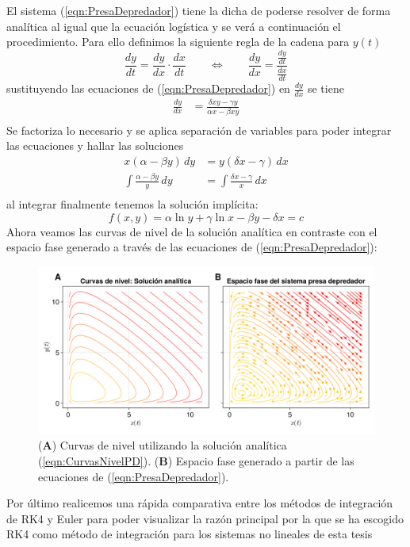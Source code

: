 El sistema (\ref{eqn:PresaDepredador}) tiene la dicha de poderse resolver de forma analítica al igual que la ecuación logística y se verá a continuación el procedimiento. Para ello definimos la siguiente regla de la cadena para $y(t)$
$$\frac{dy}{dt} = \frac{dy}{dx}\cdot\frac{dx}{dt}\qquad\Longleftrightarrow\qquad\frac{dy}{dx}=\frac{\frac{dy}{dt}}{\frac{dx}{dt}}$$
sustituyendo las ecuaciones de (\ref{eqn:PresaDepredador}) en $\frac{dy}{dx}$ se tiene
\begin{align*}
	\frac{dy}{dx}&=\frac{\delta xy-\gamma y}{\alpha x-\beta xy}  \\
\end{align*}
Se factoriza lo necesario y se aplica separación de variables para poder integrar las ecuaciones y hallar las soluciones
\begin{align*}
	x(\alpha-\beta y)\, dy &= y(\delta x-\gamma)\, dx\\
	\int \frac{\alpha-\beta y}{y}\, dy &= \int \frac{\delta x-\gamma}{x}\, dx \\
\end{align*}
al integrar finalmente tenemos la solución implícita:
\begin{equation}\label{eqn:CurvasNivelPD}
	f(x,y)=\alpha\ln y+\gamma\ln x-\beta y- \delta x=c
\end{equation}
Ahora veamos las curvas de nivel de la solución analítica en contraste con el espacio fase generado a través de las ecuaciones de (\ref{eqn:PresaDepredador}):
\begin{figure}[h!]
	\centering
	\includegraphics[scale=0.22]{../Imagenes/Curvas de nivel PD}
	\caption{(\textbf{A}) Curvas de nivel utilizando la solución analítica (\ref{eqn:CurvasNivelPD}). (\textbf{B}) Espacio fase generado a partir de las ecuaciones de (\ref{eqn:PresaDepredador}).}
	\label{fig:CurvasNivelPD}
\end{figure}
\newpage
Por último realicemos una rápida comparativa entre los métodos de integración de RK4 y Euler para poder visualizar la razón principal por la que se ha escogido RK4 como método de integración para los sistemas no lineales de esta tesis
